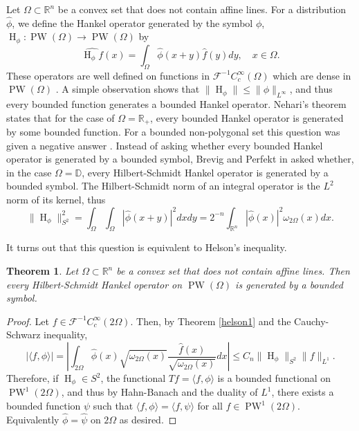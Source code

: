 \documentclass{amsart}
\theoremstyle{plain}
\newtheorem{theo}{Theorem}[section]
\DeclareMathOperator{\Ha}{H}
\DeclareMathOperator{\PW}{PW}
\begin{document}
Let $\Omega\subset\mathbb{R}^n$ be a convex set that does not contain affine lines. For a distribution $\widehat{\phi}$, we define the Hankel operator generated by the symbol $\phi$, $\Ha_\phi:\PW(\Omega)\to \PW(\Omega)$ by 
$$\widehat{\Ha_\phi f}(x)=\int_{\Omega}\widehat{\phi}(x+y)\hat{f}(y)dy,\quad x\in \Omega.$$
These operators are well defined on functions in $\mathcal{F}^{-1}C_c^\infty(\Omega)$ which are dense in $\PW(\Omega)$ \cite[Lemma 2.6]{bampouras2026boundaryweightedfourierinequalitiesconvex}. A simple observation shows that $\|\Ha_\phi\|\leq \|\phi\|_{L^\infty}$, and thus every bounded function generates a bounded Hankel operator. Nehari's theorem \cite{nehari1957bounded} states that for the case of $\Omega=\mathbb{R}_+$, every bounded Hankel operator is generated by some bounded function. For a bounded non-polygonal set this question was given a negative answer \cite{MR4700194,MR4502777}. Instead of asking whether every bounded Hankel operator is generated by a bounded symbol, Brevig and Perfekt in \cite{MR4502777} asked whether, in the case $\Omega=\mathbb{D}$, every Hilbert-Schmidt Hankel operator is generated by a bounded symbol. The Hilbert-Schmidt norm of an integral operator is the $L^2$ norm of its kernel, thus
$$\|\Ha_\phi\|_{S^2}^2=\int_\Omega \int_\Omega |\widehat{\phi}(x+y)|^2dxdy=2^{-n}\int_{\mathbb{R}^n}|\widehat{\phi}(x)|^2\omega_{2\Omega}(x)dx.$$

It turns out that this question is equivalent to Helson's inequality.
\begin{theo}\label{hilbertnehari}
	Let $\Omega\subset\mathbb{R}^n$ be a convex set that does not contain affine lines. Then every Hilbert-Schmidt Hankel operator on $\PW(\Omega)$ is generated by a bounded symbol.
\end{theo}
\begin{proof}
	Let $f\in \mathcal{F}^{-1}C_c^\infty(2\Omega).$ Then, by Theorem \ref{helson1} and the Cauchy-Schwarz inequality,
	$$|\langle f,\phi\rangle|=|\int_{2\Omega}\widehat{\phi}(x)\sqrt{\omega_{2\Omega}(x)}\frac{\hat{f}(x)}{\sqrt{\omega_{2\Omega}(x)}}dx|\leq C_n\|\Ha_\phi\|_{S^2}\|f\|_{L^1}.$$ Therefore, if $\Ha_\phi\in S^2$, the functional $Tf=\langle f,\phi\rangle$ is a bounded functional on $\PW^1(2\Omega)$, and thus by Hahn-Banach and the duality of $L^1$, there exists a bounded function $\psi$ such that $\langle f,\phi\rangle=\langle f,\psi\rangle$ for all $f\in \PW^1(2\Omega).$ Equivalently $\widehat{\phi}=\widehat{\psi}$ on $2\Omega$ as desired.
\end{proof}
\end{document}
